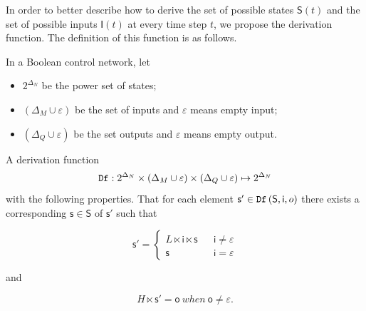  
In order to better describe how to derive the set of possible states $\mathsf{S}(t)$ and the set of possible inputs $\mathsf{I}(t)$ at every time step $t$, we propose the derivation function. The definition of this function is as follows.
\begin{definition} 
In a Boolean control network, let
\begin{itemize}
\item $2^{\Delta_N}$ be the power set of states; 
\item $(\Delta_M\cup\varepsilon)$ be the set of inputs and $\varepsilon$ means empty input; 
\item $(\Delta_Q\cup\varepsilon)$ be the set outputs and $\varepsilon$ means empty output.
\end{itemize} 
A derivation function \[{\tt Df}:2^{\Delta_N}\times (\Delta_M\cup\varepsilon) \times (\Delta_Q\cup\varepsilon) \mapsto 2^{\Delta_N}\] %
with the following properties. 
	That for each element $\mathsf{s}'\in {\tt Df}\left(\mathsf{S}, \mathsf{i}, {o}\right)$ there exists a corresponding $\mathsf{s}\in \mathsf{S}$ of $\mathsf{s}'$ such that 

\[\mathsf{s}'=\left\{
\begin{array}{rcl}
L\ltimes \mathsf{i}\ltimes \mathsf{s}      &      & {\mathsf{i}\neq \varepsilon}\\
\mathsf{s}       &      & {\mathsf{i}= \varepsilon}
\end{array} \right. \]

and 

\[H\ltimes \mathsf{s}'=\mathsf{o}\ when\ \mathsf{o}\neq \varepsilon.\]

\end{definition}


